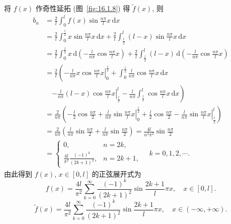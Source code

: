 \begin{solution}
将 $f(x)$ 作奇性延拓 (图~\ref{fig:16.1.8}) 得 $\tilde{f}(x)$, 则
\[
  \begin{aligned}
    b_{n}&=\frac{2}{l}\int_{0}^{l}f(x)\sin\frac{n\pi}{l}x\,\mathrm{d}x\\
    &=\frac{2}{l}\int_{0}^{\frac{l}{2}}x\sin\frac{n\pi}{l}x\,\mathrm{d}x+\frac{2}{l}\int_{\frac{l}{2}}^{l}(l-x)\sin\frac{n\pi}{l}x\,\mathrm{d}x\\
    &=\frac{2}{l}\int_{0}^{\frac{l}{2}}x\,\mathrm{d}\left(-\frac{l}{n\pi}\cos\frac{n\pi}{l}x\right)+\frac{2}{l}\int_{\frac{l}{2}}^{l}(l-x)\,\mathrm{d}\left(-\frac{l}{n\pi}\cos\frac{n\pi}{l}x\right)\\
    &=\frac{2}{l}\left(-\left.\frac{l}{n\pi}x\cos\frac{n\pi}{l}x\right|_{0}^{\frac{l}{2}}+\int_{0}^{\frac{l}{2}}\frac{l}{n\pi}\cos\frac{n\pi}{l}x\,\mathrm{d}x\right.\\
    &\quad\left.-\left.\frac{l}{n\pi}(l-x)\cos\frac{n\pi}{l}x\right|_{\frac{l}{2}}^{l}-\frac{l}{n\pi}\int_{\frac{l}{2}}^{l}\cos\frac{n\pi}{l}x\,\mathrm{d}x\right)\\
    &=\frac{2}{n\pi}\left(-\frac{l}{2}\cos\frac{n\pi}{2}+\left.\frac{l}{n\pi}\sin\frac{n\pi}{l}x\right|_{0}^{\frac{l}{2}}+\frac{l}{2}\cos\frac{n\pi}{2}-\left.\frac{l}{n\pi}\sin\frac{n\pi}{l}x\right|_{\frac{l}{2}}^{l}\right)\\
    &=\frac{2}{n\pi}\left(\frac{l}{n\pi}\sin\frac{n\pi}{2}+\frac{l}{n\pi}\sin\frac{n\pi}{2}\right)=\frac{4l}{n^{2}\pi^{2}}\sin\frac{n\pi}{2}\\
    &=\begin{cases}
      0, & n=2k,\\
      \displaystyle\frac{4l}{\pi^{2}}\frac{(-1)^{k}}{(2k+1)^{2}}, & n=2k+1,
\end{cases}\quad k=0,1,2,\cdots.
  \end{aligned}
\]
由此得到 $f(x)$, $x\in[0,l]$ 的正弦展开式为
\[
  f(x)=\frac{4l}{\pi^{2}}\sum_{k=0}^{\infty}\frac{(-1)^{k}}{(2k+1)^{2}}\sin\frac{2k+1}{l}\pi x,\quad x\in[0,l].%
\]
\[
  \tilde{f}(x)=\frac{4l}{\pi^{2}}\sum_{k=0}^{\infty}\frac{(-1)^{k}}{(2k+1)^{2}}\sin\frac{2k+1}{l}\pi x,\quad x\in(-\infty,+\infty).
\]
\end{solution}

